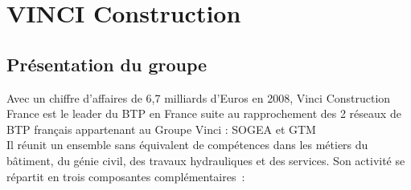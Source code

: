 \section {VINCI Construction}

\subsection{Présentation du groupe}

Avec un chiffre d’affaires de 6,7 milliards d’Euros en 2008, Vinci Construction France est le leader du BTP en France suite au rapprochement des 2 réseaux de BTP français appartenant au Groupe Vinci : SOGEA et GTM \\

Il réunit un ensemble sans équivalent de compétences dans les métiers du bâtiment, du génie civil, des travaux hydrauliques et des services.
Son activité se répartit en trois composantes complémentaires : \\

